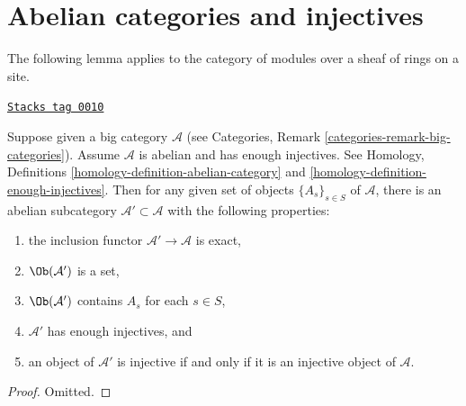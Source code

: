 \section{Abelian categories and injectives}
\label{sets-section-abelian-categories-injectives}
The following lemma applies to the category of modules over a sheaf
of rings on a site.

\begin{lemma}
\label{sets-lemma-abelian-injectives}
\href{https://stacks.math.columbia.edu/tag/0010}{\texttt{Stacks tag 0010}}

Suppose given a big category $\mathcal{A}$ (see
Categories, Remark \ref{categories-remark-big-categories}).
Assume $\mathcal{A}$ is abelian and has enough injectives.
See Homology, Definitions \ref{homology-definition-abelian-category}
and \ref{homology-definition-enough-injectives}.
Then for any given set of objects $\{A_s\}_{s\in S}$
of $\mathcal{A}$, there is an abelian subcategory
$\mathcal{A}' \subset \mathcal{A}$
with the following properties:
\begin{enumerate}
\item the inclusion functor $\mathcal{A}' \to \mathcal{A}$ is exact,
\item $\Ob(\mathcal{A}')$ is a set,
\item $\Ob(\mathcal{A}')$ contains $A_s$ for each $s \in S$,
\item $\mathcal{A}'$ has enough injectives, and
\item an object of $\mathcal{A}'$ is injective if and only if it
is an injective object of $\mathcal{A}$.
\end{enumerate}
\end{lemma}

\begin{proof}
Omitted.
\end{proof}



